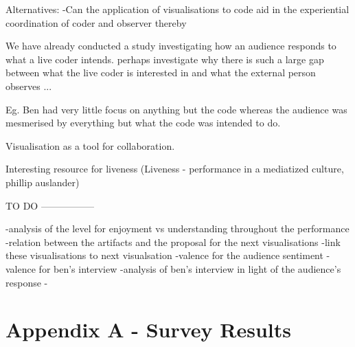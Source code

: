 \documentclass[12pt]{article}
\begin{document}
Alternatives:
-Can the application of visualisations to code aid in the experiential coordination of coder and observer thereby  


We have already conducted a study investigating how an audience responds to what a live coder intends. perhaps investigate why there is such a large gap between what the live coder is interested in and what the external person observes ...

Eg. Ben had very little focus on anything but the code whereas the audience was mesmerised by everything but what the code was intended to do.

Visualisation as a tool for collaboration.


Interesting resource for liveness (Liveness - performance in a mediatized culture, phillip auslander)



TO DO
-----------------

-analysis of the level for enjoyment vs understanding throughout the performance
-relation between the artifacts and the proposal for the next visualisations
-link these visualisations to next visualsation
-valence for the audience sentiment
-valence for ben's interview
-analysis of ben's interview in light of the audience's response
-




\newpage
\section*{Appendix A - Survey Results}
\end{document}
